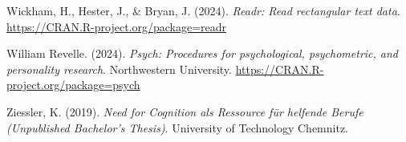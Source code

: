 \documentclass[
  man]{apa6}
\newlength{\cslhangindent}
\newenvironment{CSLReferences}[2] %
 {\begin{list}{}{%
  \setlength{\itemindent}{0pt}
  \setlength{\leftmargin}{0pt}
  \setlength{\parsep}{0pt}
  \ifodd #1
   \setlength{\leftmargin}{\cslhangindent}
   \setlength{\itemindent}{-1\cslhangindent}
  \fi
  \setlength{\itemsep}{#2\baselineskip}}}
 {\end{list}}
\begin{document}
\begin{CSLReferences}{1}{0}
Wickham, H., Hester, J., \& Bryan, J. (2024). \emph{Readr: Read rectangular text data}. \url{https://CRAN.R-project.org/package=readr}

William Revelle. (2024). \emph{Psych: Procedures for psychological, psychometric, and personality research}. Northwestern University. \url{https://CRAN.R-project.org/package=psych}

Ziessler, K. (2019). \emph{{Need for Cognition als Ressource für helfende Berufe} ({Unpublished Bachelor's Thesis})}. University of Technology Chemnitz.

\end{CSLReferences}
\end{document}
